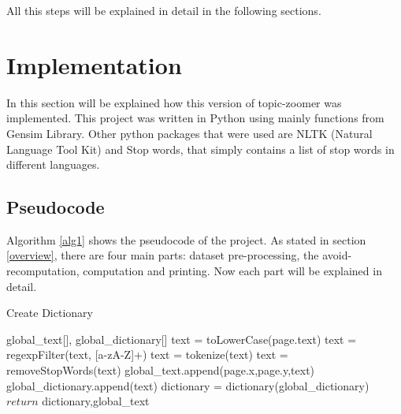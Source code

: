 \documentclass{sig-alternate-05-2015}
\begin{document}
All this steps will be explained in detail in the following sections.

\section{Implementation}\label{implementation}
In this section will be explained how this version of topic-zoomer was implemented.
This project was written in Python using mainly functions from Gensim Library. Other python packages that were used are NLTK (Natural Language Tool Kit) and Stop words, that simply contains a list of stop words in different languages.
\subsection{Pseudocode}

Algorithm \ref{alg1} shows the pseudocode of the project.
As stated in section \ref{overview}, there are four main parts: dataset pre-processing, the avoid-recomputation, computation and printing. Now each part will be explained in detail.
\begin{algorithm*}[t]
\caption{Create Dictionary}\label{cleanText}
\begin{algorithmic}[1]
	\State global\_text[], global\_dictionary[]
	\State text = toLowerCase(page.text)
    \State text = regexpFilter(text, [a-zA-Z]+)
    \State text = tokenize(text)
    \State text = removeStopWords(text)
   \State global\_text.append(page.x,page.y,text)
   \State global\_dictionary.append(text)
    \EndFor
     \State dictionary = dictionary(global\_dictionary) 
    \State $return$ dictionary,global\_text   
\EndProcedure
\end{algorithmic}
\end{algorithm*}
\end{document}
